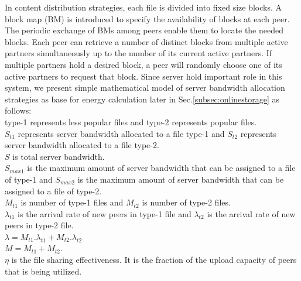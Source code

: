 \documentclass[conference]{IEEEtran}
\begin{document}
In content distribution strategies, each file is divided into fixed size blocks.
A block map (BM) is introduced to specify the availability of blocks at each peer. 
The periodic exchange of BMs among peers enable them to locate the needed blocks. 
Each peer can retrieve a number of distinct blocks from multiple active partners simultaneously up to the number of its current active partners.
If multiple partners hold a desired block, a peer will randomly choose one of its active partners to request that block.
Since server hold important role in this system, we present simple mathematical model of server bandwidth allocation strategies \cite{4024139,Sun:2009:POS:1542245.1542249} as base for energy calculation later in Sec.\ref{subsec:onlinestorage} as follows:\\
type-1 represents less popular files and type-2 represents popular files. \\
$S_{t1}$ represents server bandwidth allocated to a file type-1 and $S_{t2}$ represents server bandwidth allocated to a file type-2. \\
$S$ is total server bandwidth. \\
$S_{max1}$ is the maximum amount of server bandwidth that can be assigned to a file of type-1 and $S_{max2}$ is the maximum amount of server bandwidth that can be assigned to a file of type-2.\\
$M_{t1}$ is number of type-1 files and  $M_{t2}$ is number of type-2 files.\\
$\lambda_{t1}$ is the arrival rate of new peers in type-1 file and $\lambda_{t2}$ is the arrival rate of new peers in type-2 file.\\
$\lambda = M_{t1}.\lambda_{t1} + M_{t2}.\lambda_{t2}$\\
$M=M_{t1} + M_{t2}$.\\
$\eta$ is the file sharing effectiveness. It is the fraction of the upload capacity of peers that is being utilized.\\
\end{document}
